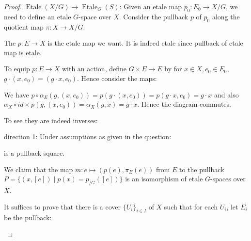 \documentclass[a4paper]{article}
\DeclareMathOperator{\Et}{\text {Etale}}
\begin{document}
\begin{proof}
    
    $\Et(X/G)\to \Et_G(S)$: Given an etale map $p_0:E_0\to X/G$, we need to define an etale $G$-space over $X$. Consider the pullback $p$ of $p_0$ along the quotient map $\pi:X\to X/G$:
    \begin{center}
    \end{center}
    The $p:E\to X$ is the etale map we want. It is indeed etale since pullback of etale map is etale. 

    To equip $p:E\to X$ with an action, define $G\times E\to E$ by for $x\in X, e_0\in E_0$, $g\cdot (x,e_0)=(g\cdot x,e_0)$. Hence consider the maps:
    \begin{center}
    \end{center}

    We have $p\circ \alpha_E(g,(x,e_0))=p(g\cdot (x,e_0))=p(g\cdot x,e_0)=g\cdot x$ and also $\alpha_X\circ id\times p(g,(x,e_0))=\alpha_X(g,x)=g\cdot x$. Hence the diagram commutes. 

    To see they are indeed inverses:

    direction 1: Under assumptions as given in the question:

    \begin{center}
    \end{center}

    is a pullback square.

    We claim that the map $m:e\mapsto (p(e),\pi_E(e))$ from $E$ to the pullback $P=\{(x,[e])\mid p(x)=p_{/G}([e])\}$ is an isomorphism of etale $G$-spaces over $X$.

    It suffices to prove that there is a cover $\{U_i\}_{i\in I}$ of $X$ such that for each $U_i$, let $E_i$ be the pullback:

    \begin{center}
    \end{center}


\end{proof}
\end{document}

